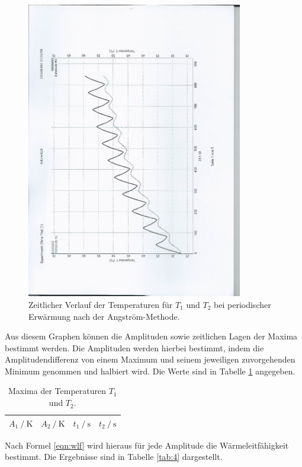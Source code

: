 \begin{figure}
  \centering
  \includegraphics[height=13cm, angle=270]{scan-3.jpg}
  \caption{Zeitlicher Verlauf der Temperaturen für $T_1$ und $T_2$ bei periodischer Erwärmung nach der Angström-Methode.}
  \label{fig:5}
\end{figure}

Aus diesem Graphen können die Amplituden sowie zeitlichen Lagen der Maxima bestimmt werden.
Die Amplituden werden hierbei bestimmt, indem die Amplitudendifferenz von einem Maximum und seinem jeweiligen zuvorgehenden Minimum genommen und halbiert wird.
Die Werte sind in Tabelle \ref{tab:3} angegeben.

\begin{table}
  \centering
  \caption{Maxima der Temperaturen $T_1$ und $T_2$.}
  \label{tab:3}
  \begin{tabular}{c c c c}
    \toprule
    {$A_1 \:/\: \si{\kelvin}$} & {$A_2 \:/\: \si{\kelvin}$}  & {$t_1 \:/\: \si{\second}$}  & {$t_2 \:/\: \si{\second}$}\\
    \midrule
    
    \bottomrule
  \end{tabular}
\end{table}

Nach Formel \eqref{eqn:wlf} wird hieraus für jede Amplitude die Wärmeleitfähigkeit bestimmt.
Die Ergebnisse sind in Tabelle \ref{tab:4} dargestellt.

